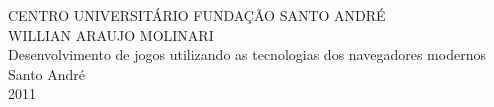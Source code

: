 \thispagestyle{empty}
\begin{center}
\large CENTRO UNIVERSITÁRIO FUNDAÇÃO SANTO ANDRÉ \\
\vspace{1cm}
\large WILLIAN ARAUJO MOLINARI \\
\vspace{8cm}
\huge Desenvolvimento de jogos utilizando as tecnologias dos navegadores modernos \\
\vspace{9cm}
\large Santo André \\
\large 2011 \\
\end{center}
